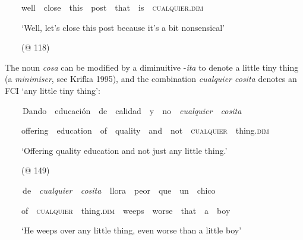 \begin{styleStandard}
\ \ \ \ well\ \ close\ \ this\ \ post\ \ that\ \ is\ \ \textsc{cualquier}.\textsc{dim}
\end{styleStandard}

\begin{styleStandard}
\ \ \ \ ‘Well, let’s close this post because it’s a bit nonsensical’
\end{styleStandard}

\begin{styleStandard}
\ \ \ \ (@ 118)
\end{styleStandard}

\begin{styleStandard}
The noun \textit{cosa} can be modified by a diminuitive -\textit{ita} to denote a little tiny thing (a\textit{ minimiser}, see Krifka 1995), and the combination \textit{cualquier cosita} denotes an FCI ‘any little tiny thing’:
\end{styleStandard}

\begin{styleStandard}
\textbf{\ \ }\ \ Dando\ \ educación\ \ de\ \ calidad\ \ y\ \ no\ \ \textit{cualquier\ \ cosita}
\end{styleStandard}

\begin{styleStandard}
\ \ \ \ offering\ \ education\ \ of\ \ quality\ \ and\ \ not\ \ \textsc{cualquier}\ \ thing.\textsc{dim}
\end{styleStandard}

\begin{styleStandard}
\ \ \ \ ‘Offering quality education and not just any little thing.’
\end{styleStandard}

\begin{styleStandard}
\ \ \ \ (@ 149)
\end{styleStandard}

\begin{styleStandard}
\textbf{\ \ }\ \ de\ \ \textit{cualquier\ \ cosita\ \ }llora\ \ peor\ \ que\ \ un\ \ chico
\end{styleStandard}

\begin{styleStandard}
\ \ \ \ of\ \ \textsc{cualquier}\ \ thing.\textsc{dim}\ \ weeps\ \ worse\ \ that\ \ a\ \ boy
\end{styleStandard}

\begin{styleStandard}
\ \ \ \ ‘He weeps over any little thing, even worse than a little boy’
\end{styleStandard}

